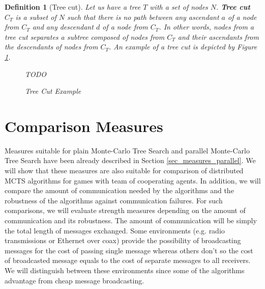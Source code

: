 \newtheorem*{deftreecut}{Definition}
\begin{deftreecut}[Tree cut]

Let us have a tree $T$ with a set of nodes $N$. \textbf{Tree cut} $C_T$ is a subset of $N$ such that
there is no path between any ascendant $a$ of a node from $C_T$ and any descendant $d$ of a node from
$C_T$. In other words, nodes from a tree cut separates a subtree composed of nodes from $C_T$ and
their ascendants from the descendants of nodes from $C_T$. An example of a tree cut is depicted by
Figure \ref{fig_tree_cut_example}.

\begin{figure}
\begin{center}
\end{center}
\caption{\footnotesize Tree Cut Example}{\footnotesize TODO}
\label{fig_tree_cut_example}
\end{figure}

\end{deftreecut}



\section{Comparison Measures}
\label{sec_measures_distributed}

Measures suitable for plain Monte-Carlo Tree Search and parallel
Monte-Carlo Tree Search have been already described in Section \ref{sec_measures_parallel}.
We will show that these
measures are also suitable for comparison of distributed MCTS algorithms for games with team
of cooperating agents. In addition, we will compare the amount of communication needed by the
algorithms and the robustness of the algorithms against communication failures. For such
comparisons, we will evaluate strength measures depending on the amount of communication and
its robustness. The amount of communication will be simply the total length of messages
exchanged. Some environments (e.g. radio transmissions or Ethernet over coax) provide the 
possibility of broadcasting messages for the cost of passing single message whereas others 
don't so the cost of broadcasted message equals to the cost of separate messages to all
receivers. We will distinguish between these
environments since some of the algorithms advantage from cheap message broadcasting.

